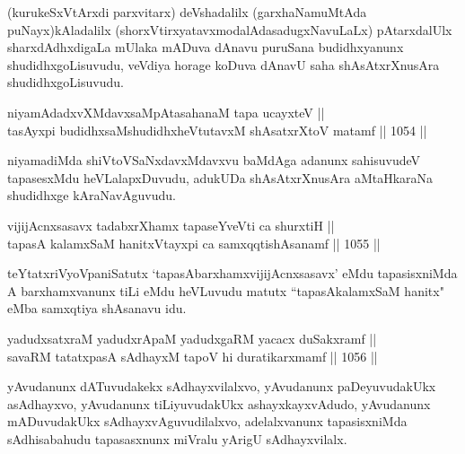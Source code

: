 \begin{artha}
(kurukeSxVtArxdi parxvitarx) deVshadalilx (garxhaNamuMtAda puNayx)kAladalilx (shorxVtirxyatavxmodalAdasadugxNavuLaLx) pAtarxdalUlx sharxdAdhxdigaLa mUlaka mADuva dAnavu puruSana budidhxyanunx shudidhxgoLisuvudu, veVdiya horage koDuva dAnavU saha shAsAtxrXnusAra shudidhxgoLisuvudu.
\end{artha}


\begin{shl}
niyamAdadxvXMdavxsaMpAtasahanaM tapa ucayxteV || \\
tasAyxpi budidhxsaMshudidhxheVtutavxM shAsatxrXtoV matamf \hfill || 1054 ||  
\end{shl}

\begin{artha}
niyamadiMda shiVtoVSaNxdavxMdavxvu baMdAga adanunx sahisuvudeV tapasesxMdu heVLalapxDuvudu, adukUDa shAsAtxrXnusAra aMtaHkaraNa shudidhxge kAraNavAguvudu.
\end{artha}

\begin{shl}
vijijAcnxsasavx tadabxrXhamx tapaseYveVti ca shurxtiH || \\
tapasA kalamxSaM hanitxVtayxpi ca samxqqtishAsanamf \hfill || 1055 ||  
\end{shl}

\begin{artha}
teYtatxriVyoVpaniSatutx `tapasAbarxhamxvijijAcnxsasavx' eMdu tapasisxniMda A barxhamxvanunx tiLi eMdu heVLuvudu matutx ``tapasAkalamxSaM hanitx" eMba samxqtiya shAsanavu idu.
\end{artha}


\begin{shl}
yadudxsatxraM yadudxrApaM yadudxgaRM yacacx duSakxramf || \\
savaRM tatatxpasA sAdhayxM tapoV hi duratikarxmamf \hfill || 1056 ||  
\end{shl}

\begin{artha}
yAvudanunx dATuvudakekx sAdhayxvilalxvo, yAvudanunx paDeyuvudakUkx asAdhayxvo, yAvudanunx tiLiyuvudakUkx ashayxkayxvAdudo, yAvudanunx mADuvudakUkx sAdhayxvAguvudilalxvo, adelalxvanunx tapasisxniMda sAdhisabahudu tapasasxnunx miVralu yArigU sAdhayxvilalx.
\end{artha}


